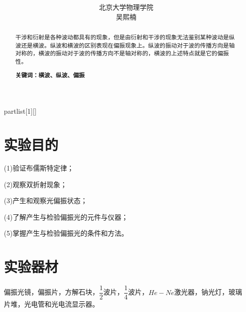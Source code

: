 \documentclass[UTF8]{ctexart}
\author{
	北京大学物理学院\\
	吴熙楠}
\title{
	\heiti{光偏振现象观察}
}
\begin{document}
	\maketitle
	\newtheorem{definition}{定义}[subsection]
	\newtheorem{function}{公式}[subsection]
	\newtheorem{summary}{小结}[subsection]
	\newtheorem{deduction}{推论}[subsection]
	\newtheorem{property}{性质}[subsection]
	\newtheorem{theo}{定理}[subsection]
	\newtheorem{step}{步骤}[subsection]
	\newtheorem{remark}{注记}[subsection]
	\newtheorem{proof}{证明}[subsection]
	\newenvironment{Theorem}[1][]{\par\noindent\textbf{定理}(#1)\quad}{\par}
	\newcommand{\rbra}[1]{\left( #1 \right)}
	\newcommand{\sbra}[1]{\left[ #1 \right]}
	\newcommand{\cbra}[1]{\left\{ #1 \right\}}
	\newcommand{\pbra}[1]{\left< #1 \right>}
	\newcommand{\abs}[1]{\left| #1 \right|}
	\newcommand{\fs}[2]{\displaystyle\frac{#1}{#2}}
	
	\newenvironment{myproof}{{\color{blue}证：}}
	
	\newenvironment{partlist}[1][]
	{\begin{enumerate}[itemsep=0pt, label=(\arabic*), wide, labelindent=\parindent, listparindent=\parindent, #1]}
		{\end{enumerate}}
	\renewcommand{\abstractname}{\Large 摘要\\}
	\begin{abstract}
		{\normalsize 干涉和衍射是各种波动都具有的现象，但是由衍射和干涉的现象无法鉴别某种波动是纵波还是横波。纵波和横波的区别表现在偏振现象上。纵波的振动对于波的传播方向是轴对称的，横波的振动对于波的传播方向不是轴对称的，横波的上述特点就是它的偏振性。
			
			\textbf{关键词：横波、纵波、偏振}}
	\end{abstract}
	
	\newpage
	\renewcommand{\contentsname}{目录} %
	\tableofcontents
	\newpage
	\section{实验目的}
	(1)验证布儒斯特定律；
	\par (2)观察双折射现象；
	\par (3)产生和观察光偏振状态；
	\par (4)了解产生与检验偏振光的元件与仪器；
	\par (5)掌握产生与检验偏振光的条件和方法。
	\section{实验器材}
	偏振光镜，偏振片，方解石块，$\dfrac{1}{2}$波片，$\dfrac{1}{4}$波片，$He-Ne$激光器，钠光灯，玻璃片堆，光电管和光电流显示器。
\end{document}
